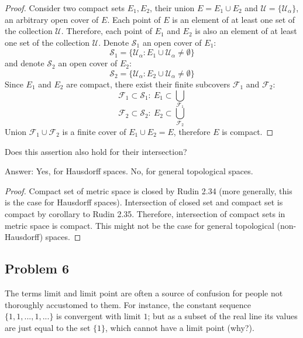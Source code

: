 \documentclass{article}
\begin{document}
\begin{proof}
Consider two compact sets $E_1, E_2$, their union $E = E_1 \cup E_2$ and $\mathcal{U} = \{ \mathcal{U}_\alpha \}$, an arbitrary open cover of $E$. Each point of $E$ is an element of at least one set of the collection $\mathcal{U}$. Therefore, each point of $E_1$ and $E_2$ is also an element of at least one set of the collection $\mathcal{U}$. Denote $\mathcal{S}_1$ an open cover of $E_1$:
$$ \mathcal{S}_1 = \{ \mathcal{U}_\alpha : E_1 \cup \mathcal{U}_\alpha \neq \emptyset \} $$
and denote $\mathcal{S}_2$ an open cover of $E_2$:
$$ \mathcal{S}_2 = \{ \mathcal{U}_\alpha : E_2 \cup \mathcal{U}_\alpha \neq \emptyset \} $$
Since $E_1$ and $E_2$ are compact, there exist their finite subcovers $\mathcal{F}_1$ and $\mathcal{F}_2$:
$$ \mathcal{F}_1 \subset \mathcal{S}_1 : \> E_1 \subset \bigcup_{\mathcal{F}_1}$$
$$ \mathcal{F}_2 \subset \mathcal{S}_2 : \> E_2 \subset \bigcup_{\mathcal{F}_2}$$
Union $\mathcal{F}_1 \cup \mathcal{F}_2$ is a finite cover of $E_1 \cup E_2 = E$, therefore $E$ is compact.

\end{proof}

\begin{tcolorbox}
Does this assertion also hold for their intersection?
\end{tcolorbox}
Answer: Yes, for Hausdorff spaces. No, for general topological spaces.

\begin{proof}
Compact set of metric space is closed by Rudin 2.34 (more generally, this is the case for Hausdorff spaces). Intersection of closed set and compact set is compact by corollary to Rudin 2.35. Therefore, intersection of compact sets in metric space is compact. This might not be the case for general topological (non-Hausdorff) spaces.
\end{proof}


\subsection*{Problem 6}

\begin{tcolorbox}
The terms limit and limit point are often a source of confusion for people not thoroughly
accustomed to them. For instance, the constant sequence $\{1, 1, . . . , 1, . . .\}$ is convergent with
limit $1$; but as a subset of the real line its values are just equal to the set $\{1\}$, which cannot
have a limit point (why?).
\end{tcolorbox}
\end{document}
